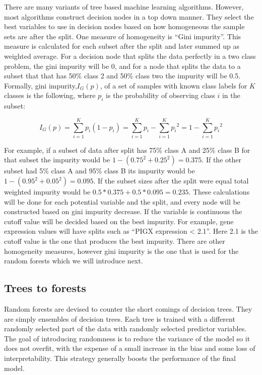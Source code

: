 \documentclass[12pt,]{krantz}
\begin{document}
There are many variants of tree based machine learning algorithms. However, most algorithms construct decision nodes in a top down manner. They select the best variables to use in decision nodes based on how homogeneous the sample sets are after the split. One measure of homogeneity is ``Gini impurity''. This measure is calculated for each subset after the split and later summed up as weighted average. For a decision node that splits the data perfectly in a two class problem, the gini impurity will be 0, and for a node that splits the data to a subset that that has 50\% class 2 and 50\% class two the impurity will be 0.5. Formally, gini impurity,\({I}_{G}(p)\), of a set of samples with known class labels for \(K\) classes is the following, where \(p_{i}\) is the probability of observing class \(i\) in the subset:

\[
{\displaystyle {I}_{G}(p)=\sum _{i=1}^{K}p_{i}(1-p_{i})=\sum _{i=1}^{K}p_{i}-\sum _{i=1}^{K}{p_{i}}^{2}=1-\sum _{i=1}^{K}{p_{i}}^{2}}
\]

For example, if a subset of data after split has 75\% class A and 25\% class B for that subset the impurity would be \(1-(0.75^2+0.25^2)=0.375\). If the other subset had 5\% class A and 95\% class B its impurity would be \(1-(0.95^2+0.05^2)=0.095\). If the subset sizes after the split were equal total weighted impurity would be \(0.5*0.375+0.5*0.095= 0.235\). These calculations will be done for each potential variable and the split, and every node will be constructed based on gini impurity decrease. If the variable is continuous the cutoff value will be decided based on the best impurity. For example, gene expression values will have splits such as ``PIGX expression \textless{} 2.1''. Here 2.1 is the cutoff value is the one that produces the best impurity. There are other homogeneity measures, however gini impurity is the one that is used for the random forests which we will introduce next.

\hypertarget{trees-to-forests}{%
\subsection{Trees to forests}\label{trees-to-forests}}

Random forests are devised to counter the short comings of decision trees. They are simply ensembles of decision trees. Each tree is trained with a different randomly selected part of the data with randomly selected predictor variables. The goal of introducing randomness is to reduce the variance of the model so it does not overfit, with the expense of a small increase in the bias and some loss of interpretability. This strategy generally boosts the performance of the final model.
\end{document}
